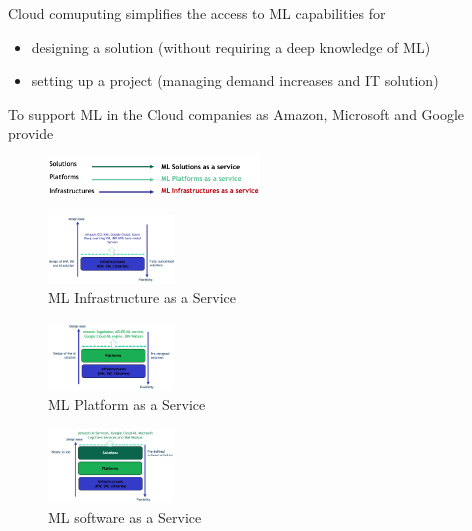 \documentclass[10pt, oneside]{article}
\begin{document}
Cloud comuputing simplifies the access to ML capabilities for\begin{itemize}
    \item designing a solution (without requiring a deep knowledge of ML)
    \item setting up a project (managing demand increases and IT solution)
\end{itemize}
To support ML in the Cloud companies as Amazon, Microsoft and Google provide\begin{figure}[H]
    \begin{center}
    \includegraphics[width=0.5\textwidth]{img/img56.png}
    \end{center}
\end{figure}
\begin{multicols}{3}
    \begin{figure}[H]
        \begin{center}
        \includegraphics[width=0.3\textwidth]{img/img57.png}
        \caption{ML Infrastructure as a Service}
        \end{center}
    \end{figure}
    \columnbreak
    \begin{figure}[H]
        \begin{center}
        \includegraphics[width=0.3\textwidth]{img/img58.png}
        \caption{ML Platform as a Service}
        \end{center}
    \end{figure}
    \columnbreak
    \begin{figure}[H]
        \begin{center}
        \includegraphics[width=0.3\textwidth]{img/img59.png}
        \caption{ML software as a Service}
        \end{center}
    \end{figure}
\end{multicols}
\end{document}

